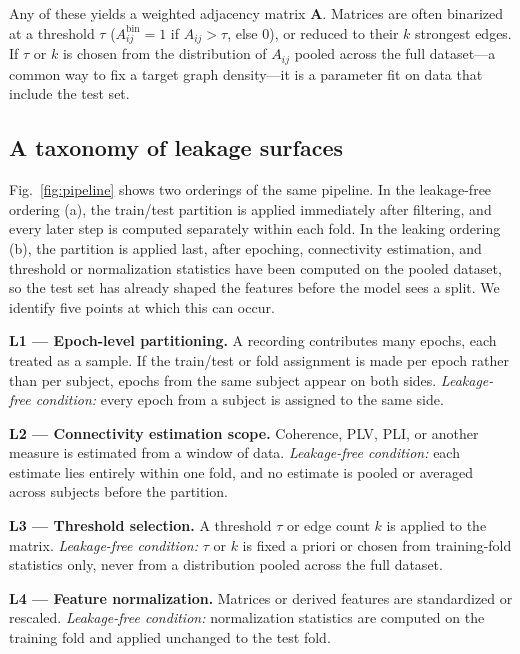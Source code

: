 Any of these yields a weighted adjacency matrix $\mathbf{A}$. Matrices are often binarized at a threshold $\tau$ ($A^{\mathrm{bin}}_{ij} = 1$ if $A_{ij} > \tau$, else 0), or reduced to their $k$ strongest edges. If $\tau$ or $k$ is chosen from the distribution of $A_{ij}$ pooled across the full dataset---a common way to fix a target graph density---it is a parameter fit on data that include the test set.

\subsection{A taxonomy of leakage surfaces}
Fig.~\ref{fig:pipeline} shows two orderings of the same pipeline. In the leakage-free ordering (a), the train/test partition is applied immediately after filtering, and every later step is computed separately within each fold. In the leaking ordering (b), the partition is applied last, after epoching, connectivity estimation, and threshold or normalization statistics have been computed on the pooled dataset, so the test set has already shaped the features before the model sees a split. We identify five points at which this can occur.



\textbf{L1 --- Epoch-level partitioning.} A recording contributes many epochs, each treated as a sample. If the train/test or fold assignment is made per epoch rather than per subject, epochs from the same subject appear on both sides. \emph{Leakage-free condition:} every epoch from a subject is assigned to the same side.

\textbf{L2 --- Connectivity estimation scope.} Coherence, PLV, PLI, or another measure is estimated from a window of data. \emph{Leakage-free condition:} each estimate lies entirely within one fold, and no estimate is pooled or averaged across subjects before the partition.

\textbf{L3 --- Threshold selection.} A threshold $\tau$ or edge count $k$ is applied to the matrix. \emph{Leakage-free condition:} $\tau$ or $k$ is fixed a priori or chosen from training-fold statistics only, never from a distribution pooled across the full dataset.

\textbf{L4 --- Feature normalization.} Matrices or derived features are standardized or rescaled. \emph{Leakage-free condition:} normalization statistics are computed on the training fold and applied unchanged to the test fold.

